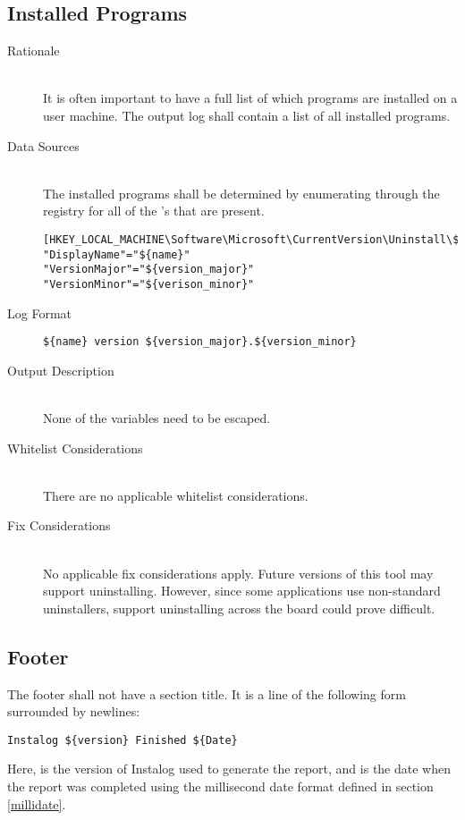 \subsection{Installed Programs}
\begin{description}
\item[Rationale] \hfill \\
It is often important to have a full list of which programs are installed on a
user machine.  The output log shall contain a list of all installed programs.  
\item[Data Sources] \hfill \\
The installed programs shall be determined by enumerating through the registry
for all of the 's that are present.
\vspace{-\baselineskip}
\begin{verbatim}
[HKEY_LOCAL_MACHINE\Software\Microsoft\CurrentVersion\Uninstall\${id}]
"DisplayName"="${name}"
"VersionMajor"="${version_major}"
"VersionMinor"="${verison_minor}"
\end{verbatim}
\item[Log Format] \hfill 
\vspace{-\baselineskip}
\begin{verbatim}
${name} version ${version_major}.${version_minor}
\end{verbatim}
\item[Output Description] \hfill \\
None of the variables need to be escaped.
\item[Whitelist Considerations] \hfill \\
There are no applicable whitelist considerations.
\item[Fix Considerations] \hfill \\
No applicable fix considerations apply.  Future versions of this tool may
support uninstalling.  However, since some applications use non-standard
uninstallers, support uninstalling across the board could prove difficult.
\end{description}

\subsection{Footer}
The footer shall not have a section title. It is a line of the following form
surrounded by newlines:
\begin{verbatim}
Instalog ${version} Finished ${Date}
\end{verbatim}

Here,  is the version of Instalog used to generate the report, and
 is the date when the report was completed using the millisecond date
format defined in section \ref{millidate}.
